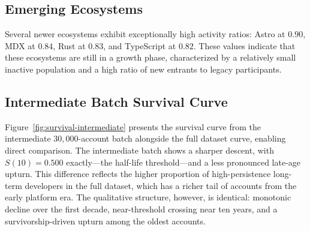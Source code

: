 \documentclass[12pt,a4paper]{article}
\begin{document}
\subsection{Emerging Ecosystems}

Several newer ecosystems exhibit exceptionally high activity ratios: Astro at $0.90$, MDX at $0.84$, Rust at $0.83$, and TypeScript at $0.82$. These values indicate that these ecosystems are still in a growth phase, characterized by a relatively small inactive population and a high ratio of new entrants to legacy participants.

\subsection{Intermediate Batch Survival Curve}

Figure~\ref{fig:survival-intermediate} presents the survival curve from the intermediate $30{,}000$-account batch alongside the full dataset curve, enabling direct comparison. The intermediate batch shows a sharper descent, with $S(10) = 0.500$ exactly---the half-life threshold---and a less pronounced late-age upturn. This difference reflects the higher proportion of high-persistence long-term developers in the full dataset, which has a richer tail of accounts from the early platform era. The qualitative structure, however, is identical: monotonic decline over the first decade, near-threshold crossing near ten years, and a survivorship-driven upturn among the oldest accounts.
\end{document}
